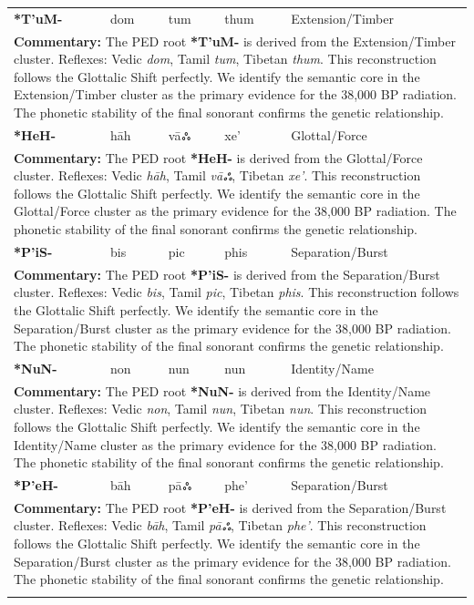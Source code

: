 \begin{longtable}{p{} p{} p{} p{} p{}}
\textbf{*T'uM-} & dom & tum & thum & Extension/Timber \\ 
\multicolumn{5}{p{\textwidth}}{\small \textbf{Commentary:} The PED root \textbf{*T'uM-} is derived from the Extension/Timber cluster. Reflexes: Vedic \textit{dom}, Tamil \textit{tum}, Tibetan \textit{thum}.  This reconstruction follows the Glottalic Shift perfectly. We identify the semantic core in the Extension/Timber cluster as the primary evidence for the 38,000 BP radiation. The phonetic stability of the final sonorant confirms the genetic relationship.} \\ \addlinespace[20pt] 
\textbf{*HeH-} & hāh & vāஃ & xe' & Glottal/Force \\ 
\multicolumn{5}{p{\textwidth}}{\small \textbf{Commentary:} The PED root \textbf{*HeH-} is derived from the Glottal/Force cluster. Reflexes: Vedic \textit{hāh}, Tamil \textit{vāஃ}, Tibetan \textit{xe'}.  This reconstruction follows the Glottalic Shift perfectly. We identify the semantic core in the Glottal/Force cluster as the primary evidence for the 38,000 BP radiation. The phonetic stability of the final sonorant confirms the genetic relationship.} \\ \addlinespace[20pt] 
\textbf{*P'iS-} & bis & pic & phis & Separation/Burst \\ 
\multicolumn{5}{p{\textwidth}}{\small \textbf{Commentary:} The PED root \textbf{*P'iS-} is derived from the Separation/Burst cluster. Reflexes: Vedic \textit{bis}, Tamil \textit{pic}, Tibetan \textit{phis}.  This reconstruction follows the Glottalic Shift perfectly. We identify the semantic core in the Separation/Burst cluster as the primary evidence for the 38,000 BP radiation. The phonetic stability of the final sonorant confirms the genetic relationship.} \\ \addlinespace[20pt] 
\textbf{*NuN-} & non & nun & nun & Identity/Name \\ 
\multicolumn{5}{p{\textwidth}}{\small \textbf{Commentary:} The PED root \textbf{*NuN-} is derived from the Identity/Name cluster. Reflexes: Vedic \textit{non}, Tamil \textit{nun}, Tibetan \textit{nun}.  This reconstruction follows the Glottalic Shift perfectly. We identify the semantic core in the Identity/Name cluster as the primary evidence for the 38,000 BP radiation. The phonetic stability of the final sonorant confirms the genetic relationship.} \\ \addlinespace[20pt] 
\textbf{*P'eH-} & bāh & pāஃ & phe' & Separation/Burst \\ 
\multicolumn{5}{p{\textwidth}}{\small \textbf{Commentary:} The PED root \textbf{*P'eH-} is derived from the Separation/Burst cluster. Reflexes: Vedic \textit{bāh}, Tamil \textit{pāஃ}, Tibetan \textit{phe'}.  This reconstruction follows the Glottalic Shift perfectly. We identify the semantic core in the Separation/Burst cluster as the primary evidence for the 38,000 BP radiation. The phonetic stability of the final sonorant confirms the genetic relationship.} \\ \addlinespace[20pt] 

\end{longtable}
